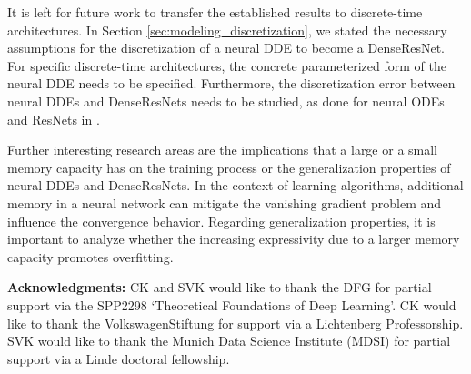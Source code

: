 \documentclass[10pt]{article}
\numberwithin{equation}{section}
\begin{document}
	It is left for future work to transfer the established results to discrete-time architectures. In Section \ref{sec:modeling_discretization}, we stated the necessary assumptions for the discretization of a neural DDE to become a DenseResNet. For specific discrete-time architectures, the concrete parameterized form of the neural DDE needs to be specified. Furthermore, the discretization error between neural DDEs and DenseResNets needs to be studied, as done for neural ODEs and ResNets in \cite{Sander2022}. 
	
	Further interesting research areas are the implications that a large or a small memory capacity has on the training process or the generalization properties of neural DDEs and DenseResNets. In the context of learning algorithms, additional memory in a neural network can mitigate the vanishing gradient problem and influence the convergence behavior. Regarding generalization properties, it is important to analyze whether the increasing expressivity due to a larger memory capacity promotes overfitting.
	
	\vspace{5mm}
	
	
	\textbf{Acknowledgments:} CK and SVK would like to thank the DFG for partial support via the SPP2298 `Theoretical Foundations of Deep Learning'. CK would like to thank the VolkswagenStiftung for support via a Lichtenberg Professorship. SVK would like to thank the Munich Data Science Institute (MDSI) for partial support via a Linde doctoral fellowship.
	
	\vspace{3mm}
	
	
	
\end{document}
